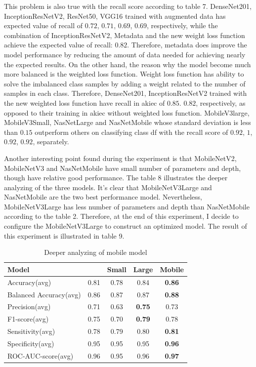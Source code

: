 \documentclass[sensors,article,submit,pdftex,moreauthors]{Definitions/mdpi}
\begin{document}
This problem is also true with the recall score according to table 7. DenseNet201, InceptionResNetV2, ResNet50, VGG16 trained with augmented data has expected value of recall of $0.72$, $0.71$, $0.69$, $0.69$, respectively, while the combination of InceptionResNetV2, Metadata and the new weight loss function achieve the expected value of recall: $0.82$.
Therefore, metadata does improve the model performance by reducing the amount of data needed for achieving nearly the expected results. On the other hand, the reason why the model become much more balanced is the weighted loss function. Weight loss function has ability to solve the imbalanced class samples by adding a weight related to the number of samples in each class. Therefore, DenseNet201, InceptionResNetV2 trained with the new weighted loss function have recall in akiec of $0.85$. $0.82$, respectively, as opposed to their training in akiec without weighted loss function. MobileV3large, MobileV3Small, NasNetLarge and NasNetMobile whose standard deviation is less than $0.15$ outperform others on classifying class df with the recall score of $0.92$, $1$, $0.92$, $0.92$, separately. 

Another interesting point found during the experiment is that MobileNetV2, MobileNetV3 and NasNetMobile have small number of parameters and depth, though have relative good performance. The table 8 illustrates the deeper analyzing of the three models. It's clear that MobileNetV3Large and NasNetMobile are the two best performance model. Nevertheless, MobileNetV3Large has less number of parameters and depth than NasNetMobile according to the table 2. Therefore, at the end of this experiment, I decide to configure the MobileNetV3Large to construct an optimized model. The result of this experiment is illustrated in table 9.

\begin{table}[ht]
	\centering	
	\begin{tabular}{|l | c | c | c | c|} 
		\hline
		Model & \cite{04381} & \cite{02244}Small & \cite{02244}Large & \cite{07012}Mobile\\
		\hline
		Accuracy(avg) & 0.81 & 0.78 & 0.84 & \textbf{0.86}\\
		\hline
		Balanced Accuracy(avg) & 0.86 & 0.87 & 0.87 & \textbf{0.88}\\ 
		\hline
		Precision(avg) & 0.71 & 0.63 & \textbf{0.75} & 0.73\\
		\hline
		F1-score(avg) & 0.75 & 0.70 & \textbf{0.79} & 0.78\\
		\hline
		Sensitivity(avg) & 0.78 & 0.79 & 0.80 & \textbf{0.81}\\ 
		\hline
		Specificity(avg) & 0.95 & 0.95 & 0.95 & \textbf{0.96}\\
		\hline
		ROC-AUC-score(avg) & 0.96 & 0.95 & 0.96 & \textbf{0.97}\\
		\hline
	\end{tabular}
	\caption{Deeper analyzing of mobile model}
	\label{table:7}
\end{table} 
\end{document}
